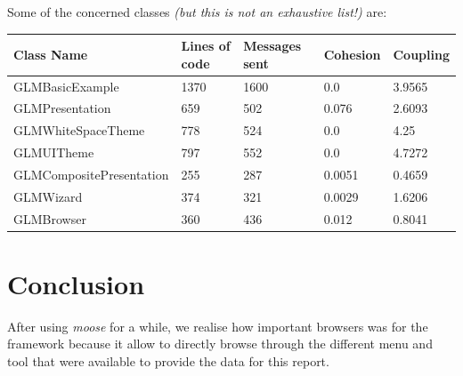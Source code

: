 \documentclass[11pt,a4paper]{article}
\begin{document}
Some of the concerned classes \textit{(but this is not an exhaustive list!)} are: \\ 


\begin{longtabu} to \textwidth {|l|X|X|X|X|}
\hline 
\small{Class Name} & \small{Lines of code} & \small{Messages sent} & \small{Cohesion} & \small{Coupling}\\
\hline
\tiny{GLMBasicExample} & 1370 & 1600 & 0.0 & 3.9565\\
\hline
\tiny{GLMPresentation} & 659 & 502 & 0.076 & 2.6093\\
\hline
\tiny{GLMWhiteSpaceTheme} & 778 & 524 & 0.0 & 4.25 \\
\hline
\tiny{GLMUITheme} & 797 & 552 & 0.0 & 4.7272\\
\hline
\tiny{GLMCompositePresentation} & 255 & 287 & 0.0051 & 0.4659\\
\hline 
\tiny{GLMWizard} &  374 & 321 & 0.0029 & 1.6206\\
\hline
\tiny{GLMBrowser} & 360 & 436 & 0.012 & 0.8041\\
\hline
\end{longtabu}
\section{Conclusion}
After using \textit{moose} for a while, we realise how important browsers was for the framework because it allow to directly browse through the different menu and tool that were available to provide the data for this report.\\
\end{document}
